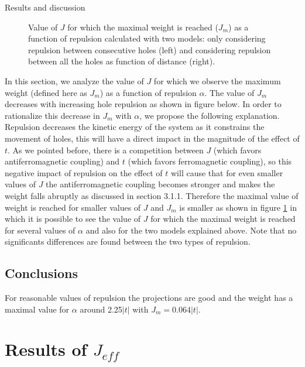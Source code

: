 \documentclass[12pt,twoside]{report}
\begin{document}
\begin{chapter}{Results and discussion}
\begin{figure}[h!]
\begin{minipage}{0.4\textwidth}
		\end{minipage}
		\caption{\label{fig_jv1n} Value of $J$ for which the maximal weight is reached ($J_m$) as a function of repulsion calculated with two models: only considering repulsion between consecutive holes (left) and considering repulsion between all the holes as function of distance (right). }
	\end{figure}

	In this section, we analyze the value of $J$ for which we observe the
	maximum weight (defined here as $J_m$) as a function of repulsion $\alpha$.
	The value of $J_m$ decreases with increasing hole repulsion as shown in
	figure below. In order to rationalize this decrease in $J_m$ with $\alpha$,
	we propose the following explanation.  Repulsion decreases the kinetic
	energy of the system as it constrains the movement of holes, this will have
	a direct impact in the magnitude of the effect of $t$. As we pointed before,
	there is a competition between $J$ (which favors antiferromagnetic coupling)
	and $t$ (which favors ferromagnetic coupling), so this negative impact of
	repulsion on the effect of $t$ will cause that for even smaller values of
	$J$ the antiferromagnetic coupling becomes stronger and makes the weight
	falls abruptly as discussed in section 3.1.1.  Therefore the maximal value
	of weight is reached for smaller values of $J$ and $J_m$ is smaller as shown
	in figure \ref{fig_jv1n} in which it is possible to see the value of $J$ for
	which the maximal weight is reached for several values of $\alpha$ and also
	for the two models explained above. Note that no significants differences
	are found between the two types of repulsion.


	\subsection{Conclusions}

	For reasonable values of repulsion the projections are good and the weight
	has a maximal value for $\alpha$ around 2.25$|t|$ with $J_m=0.064|t|$.
	
	\section{Results of $J_{eff}$}


\end{chapter}
\end{document}
